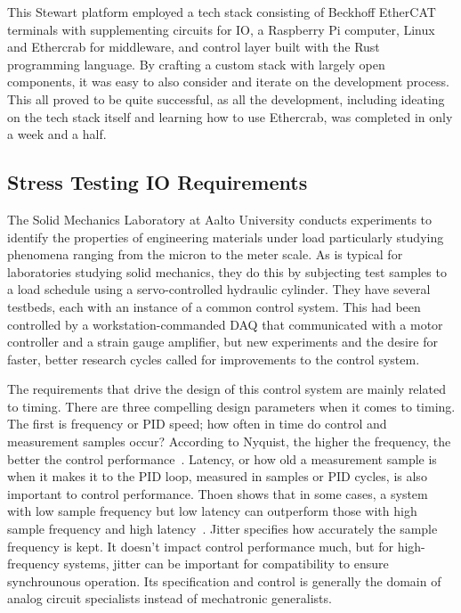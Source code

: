 \documentclass[english,12pt,a4paper,pdftex,eng,utf8]{aaltothesis}
\begin{document}
This Stewart platform employed a tech stack consisting of Beckhoff EtherCAT terminals with supplementing circuits for IO, a Raspberry Pi computer, Linux and Ethercrab for middleware, and control layer built with the Rust programming language.  By crafting a custom stack with largely open components, it was easy to also consider and iterate on the development process.  This all proved to be quite successful, as all the development, including ideating on the tech stack itself and learning how to use Ethercrab, was completed in only a week and a half.

\subsection{Stress Testing IO Requirements}

The Solid Mechanics Laboratory at Aalto University conducts experiments to identify the properties of engineering materials under load particularly studying phenomena ranging from the micron to the meter scale.  As is typical for laboratories studying solid mechanics, they do this by subjecting test samples to a load schedule using a servo-controlled hydraulic cylinder.  They have several testbeds, each with an instance of a common control system.  This had been controlled by a workstation-commanded DAQ that communicated with a motor controller and a strain gauge amplifier, but new experiments and the desire for faster, better research cycles called for improvements to the control system.

The requirements that drive the design of this control system are mainly related to timing.  There are three compelling design parameters when it comes to timing.  The first is frequency or PID speed; how often in time do control and measurement samples occur?  According to Nyquist, the higher the frequency, the better the control performance~\cite{Nyquist1928}.  Latency, or how old a measurement sample is when it makes it to the PID loop, measured in samples or PID cycles, is also important to control performance.  Thoen shows that in some cases, a system with low sample frequency but low latency can outperform those with high sample frequency and high latency~\cite{Thoen2021}.  Jitter specifies how accurately the sample frequency is kept.  It doesn't impact control performance much, but for high-frequency systems, jitter can be important for compatibility to ensure synchrounous operation.  Its specification and control is generally the domain of analog circuit specialists instead of mechatronic generalists.
\end{document}
